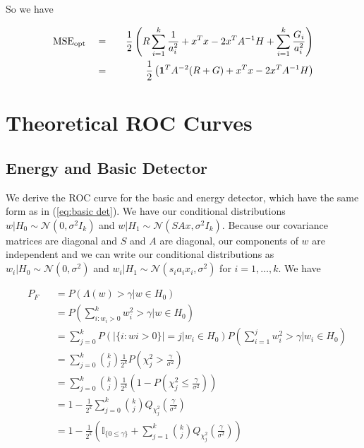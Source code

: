 \documentclass[english]{article}
\begin{document}
So we have

\begin{equation}
\begin{aligned}
&\text{MSE}_{\text{opt}}
&&=
&&&\frac{1}{2}\left(R\sum_{i=1}^k\frac{1}{a_i^2} +x^Tx - 2x^TA^{-1}H + \sum_{i=1}^k\frac{G_i}{a_i^2}\right)\\
&&&=
&&&\frac{1}{2}\left(\mathbf 1^TA^{-2}(R+G) +x^Tx - 2x^TA^{-1}H\right)\\
\end{aligned}
\end{equation}

\section{Theoretical ROC Curves}

\subsection{Energy and Basic Detector}

We derive the ROC curve for the basic and energy detector, which have the same form as in (\ref{eq:basic det}). We have our conditional distributions $w|H_0\sim\mathcal{N}(0,\sigma^2I_k)$ and $w|H_1\sim\mathcal{N}(SAx,\sigma^2I_k)$. Because our covariance matrices are diagonal and $S$ and $A$ are diagonal, our components of $w$ are independent and we can write our conditional distributions as $w_i|H_0\sim\mathcal{N}(0,\sigma^2)$ and $w_i|H_1\sim\mathcal{N}(s_ia_ix_i,\sigma^2)$ for $i=1,\dots,k$. We have

\begin{equation}\label{eq:basic PF}
\begin{aligned}
&P_F
&&=P\left(\Lambda(w)>\gamma|w\in H_0\right)\\
&&&=P\left(\sum_{i:w_i>0}^kw_i^2>\gamma|w\in H_0\right)\\
&&&=\sum_{j=0}^kP\left(|\{i:wi>0\}|=j|w_i\in H_0\right)P\left(\sum_{i=1}^jw_i^2>\gamma|w_i\in H_0\right)\\
&&&=\sum_{j=0}^k{k\choose j}\frac{1}{2^k}P\left(\chi^2_j>\frac{\gamma}{\sigma^2}\right)\\
&&&=\sum_{j=0}^k{k\choose j}\frac{1}{2^k}\left(1-P\left(\chi^2_j\leq\frac{\gamma}{\sigma^2}\right)\right)\\
&&&=1-\frac{1}{2^k}\sum_{j=0}^k{k\choose j}Q_{\chi^2_j}\left(\frac{\gamma}{\sigma^2}\right)\\
&&&=1-\frac{1}{2^k}\left(\mathbb{I}_{\{0\leq\gamma\}}+\sum_{j=1}^k{k\choose j}Q_{\chi^2_j}\left(\frac{\gamma}{\sigma^2}\right)\right)\\
\end{aligned}
\end{equation}
\end{document}
